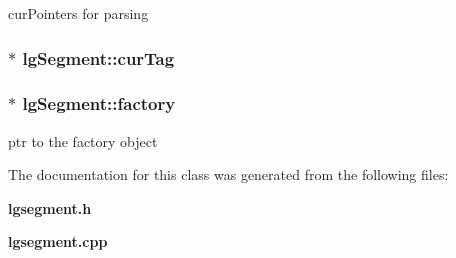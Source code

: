 cur\-Pointers for parsing 

\subsubsection{$\ast$ {\bf lg\-Segment::cur\-Tag}\hspace{0.3cm}{\tt  [private]}}\label{classlgSegment_r3}


\subsubsection{$\ast$ {\bf lg\-Segment::factory}}\label{classlgSegment_o0}


ptr to the factory object 



The documentation for this class was generated from the following files:\begin{CompactItemize}
\item 
{\bf lgsegment.h}\item 
{\bf lgsegment.cpp}\end{CompactItemize}
